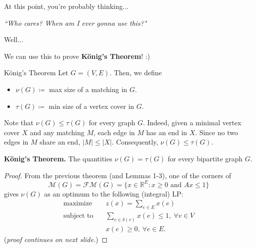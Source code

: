\begin{frame}
\begin{center}
\Large At this point, you're probably thinking...
\end{center}
\end{frame}

\begin{frame}
\begin{center}
	\Large \emph{``Who cares? When am I ever gonna use this?"}
\end{center}
\end{frame}

\begin{frame}
\begin{center}
\Large Well...
\end{center}
\end{frame}

\begin{frame}
\begin{center}
	\Large We can use this to prove \alert{\textbf{K\"onig's Theorem}}! :)
\end{center}
\end{frame}

\begin{frame}{K\"onig's Theorem}
Let \( G = (V,E) \). Then, we define\pause
\begin{itemize}
	\item \( \nu (G) \coloneqq  \) max size of a matching in \( G \).\pause
	\item \( \tau (G) \coloneqq \) min size of a vertex cover in \( G \).\pause
\end{itemize}
\vspace{0.3cm}
Note that \( \nu (G) \leq \tau (G) \) for every graph \( G \). \pause Indeed, given a minimal vertex cover $X$ and any matching $M$, each edge in $M$ has an end in $X$. Since no two edges in $M$ share an end, $|M| \leq |X|$. \pause Consequently, $\nu (G) \leq \tau (G)$.
\end{frame}

\begin{frame}
\textbf{K\"onig's Theorem.} The quantities \( \nu (G) = \tau (G) \) for every bipartite graph \( G \).\pause
\begin{proof}\renewcommand{\qedsymbol}{}
	From the previous theorem (and Lemmas 1-3), one of the corners of \[ \mathcal{M} (G) = \mathcal{FM} (G) = \{ x \in \mathbb{R}^{E} : x \geq 0 \mbox{ and } Ax \leq 1 \} \] gives \( \nu (G) \) as an optimum to the following (integral) LP:\pause
\begin{align*}
\text{maximize} \quad &z(x) = \sum_{e \in E}^{} x(e) \\
\text{subject to} \quad & \sum_{e \in \delta (v)}^{} x(e)  \leq 1, \ \forall v \in V \\
& x(e) \geq 0, \ \forall e \in E.
\end{align*}
(\emph{proof continues on next slide.})
\end{proof}
\end{frame}

